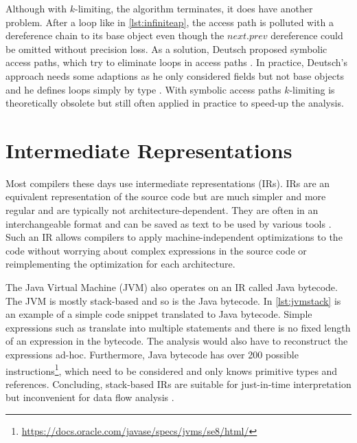 \documentclass[../draft.tex]{subfiles}
\begin{document}
    Although with $k$-limiting, the algorithm terminates, it does have another problem. 
    After a loop like in \autoref{lst:infiniteap}, the access path is polluted with a dereference chain to its base object even though the $next.prev$ dereference could be omitted without precision loss. 
    As a solution, Deutsch proposed symbolic access paths, which try to eliminate loops in access paths \cite{Deutsch1994}. 
    In practice, Deutsch's approach needs some adaptions as he only considered fields but not base objects and he defines loops simply by type \cite{Arzt2017PhD}. 
    With symbolic access paths $k$-limiting is theoretically obsolete but still often applied in practice to speed-up the analysis.

    \section{Intermediate Representations}\label{s:jimple}
    Most compilers these days use intermediate representations (IRs). 
    IRs are an equivalent representation of the source code but are much simpler and more regular and are typically not architecture-dependent. 
    They are often in an interchangeable format and can be saved as text to be used by various tools \cite{Thain2019}.
    Such an IR allows compilers to apply machine-independent optimizations to the code without worrying about complex expressions in the source code or reimplementing the optimization for each architecture. 

    The Java Virtual Machine (JVM) also operates on an IR called Java bytecode. 
    The JVM is mostly stack-based and so is the Java bytecode. 
    In \autoref{lst:jvmstack} is an example of a simple code snippet translated to Java bytecode. 
    Simple expressions such as  translate into multiple statements and there is no fixed length of an expression in the bytecode. 
    The analysis would also have to reconstruct the expressions ad-hoc. 
    Furthermore, Java bytecode has over 200 possible instructions\footnote{\url{https://docs.oracle.com/javase/specs/jvms/se8/html/}}, which need to be considered and only knows primitive types and references. 
    Concluding, stack-based IRs are suitable for just-in-time interpretation but inconvenient for data flow analysis \cite{Valleerai2004}.
\end{document}
